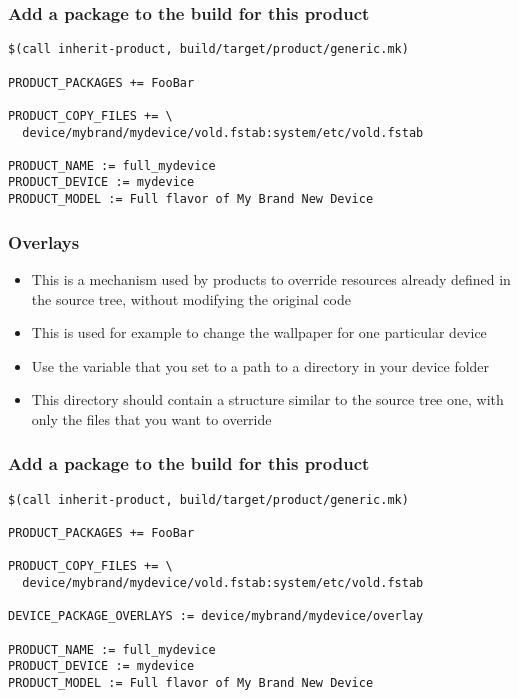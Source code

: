 \begin{frame}[fragile]
  \frametitle{Add a package to the build for this product}
\begin{verbatim}
$(call inherit-product, build/target/product/generic.mk)

PRODUCT_PACKAGES += FooBar

PRODUCT_COPY_FILES += \
  device/mybrand/mydevice/vold.fstab:system/etc/vold.fstab

PRODUCT_NAME := full_mydevice
PRODUCT_DEVICE := mydevice
PRODUCT_MODEL := Full flavor of My Brand New Device
\end{verbatim}
\end{frame}

\begin{frame}
  \frametitle{Overlays}
  \begin{itemize}
  \item This is a mechanism used by products to override resources
    already defined in the source tree, without modifying the original
    code
  \item This is used for example to change the wallpaper for one
    particular device
  \item Use the  variable that you set to a
    path to a directory in your device folder
  \item This directory should contain a structure similar to the
    source tree one, with only the files that you want to override
  \end{itemize}
\end{frame}


\begin{frame}[fragile]
  \frametitle{Add a package to the build for this product}
\begin{verbatim}
$(call inherit-product, build/target/product/generic.mk)

PRODUCT_PACKAGES += FooBar

PRODUCT_COPY_FILES += \
  device/mybrand/mydevice/vold.fstab:system/etc/vold.fstab

DEVICE_PACKAGE_OVERLAYS := device/mybrand/mydevice/overlay

PRODUCT_NAME := full_mydevice
PRODUCT_DEVICE := mydevice
PRODUCT_MODEL := Full flavor of My Brand New Device
\end{verbatim}
\end{frame}

